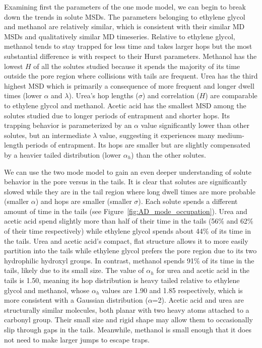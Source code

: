 \documentclass[aps,pre,preprint,groupedaddress,longbibliography]{revtex4-2}
\begin{document}
  Examining first the parameters of the one mode model, we can begin to break
  down the trends in solute MSDs. The parameters belonging to ethylene glycol
  and methanol are relatively similar, which is consistent with their similar MD
  MSDs and qualitatively similar MD timeseries.
  Relative to ethylene glycol, methanol tends to stay trapped for less
  time and takes larger hops but the most substantial difference is with
  respect to their Hurst parameters. Methanol has the lowest $H$ of all the
  solutes studied because it spends the majority of its time outside the pore
  region where collisions with tails are frequent.
  Urea has the third highest MSD which is primarily a consequence of more
  frequent and longer dwell times (lower $\alpha$ and $\lambda$). Urea's hop
  lengths ($\sigma$) and correlation ($H$) are comparable to ethylene glycol
  and methanol. Acetic acid has the smallest MSD among the solutes studied due
  to longer periods of entrapment and shorter hops. Its trapping behavior is
  parameterized by an $\alpha$ value significantly lower than other solutes,
  but an intermediate $\lambda$ value, suggesting it experiences many
  medium-length periods of entrapment. Its hops are smaller but are slightly
  compensated by a heavier tailed distribution (lower $\alpha_h$) than the
  other solutes. 
  
  We can use the two mode model to gain an even deeper understanding of solute
  behavior in the pore versus in the tails. It is clear that solutes are
  significantly slowed while they are in the tail region where long dwell times
  are more probable (smaller $\alpha$) and hops are smaller (smaller $\sigma$).
  Each solute spends a different amount of time in the tails (see
  Figure~\ref{fig:AD_mode_occupation}). Urea and acetic acid spend slightly
  more than half of their time in the tails (56\% and 62\% of their time
  respectively) while ethylene glycol spends about 44\% of its time in the
  tails. Urea and acetic acid's compact, flat structure allows it to more
  easily partition into the tails while ethylene glycol prefers the pore region
  due to its two hydrophilic hydroxyl groups. In contrast, methanol spends 91\%
  of its time in the tails, likely due to its small size. The value of
  $\alpha_h$ for urea and acetic acid in the tails is 1.50, meaning its hop
  distribution is heavy tailed relative to ethylene glycol and methanol, whose
  $\alpha_h$ values are 1.90 and 1.85 respectively, which is more consistent
  with a Gaussian distribution ($\alpha$=2). Acetic acid and urea are
  structurally similar molecules, both planar with two heavy atoms attached to
  a carbonyl group. Their small size and rigid shape may allow them to
  occasionally slip through gaps in the tails. Meanwhile, methanol is small
  enough that it does not need to make larger jumps to escape traps.
\end{document}
